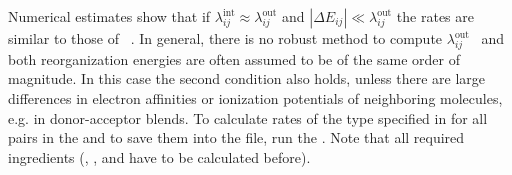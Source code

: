 Numerical estimates show that if  $\lambda_{ij}^\text{int} \approx \lambda_{ij}^\text{out}$ and $|\Delta E_{ij}| \ll \lambda_{ij}^\text{out}$ the rates are similar to those of ~. In general, there is no robust method to compute $\lambda_{ij}^\text{out}$~\cite{hoffman_reorganization_1996} and  both reorganization energies are often assumed to be of the same order of magnitude. In this case the second condition also holds, unless there are large differences in electron affinities or ionization potentials of neighboring molecules, e.g. in donor-acceptor blends.
\vskip 0.4cm
To calculate rates of the type specified in \xmloptions for all pairs in the  and to save them into the \sqlstate file, run the  \calculator. Note that all required ingredients (, , and  have to be calculated before).
